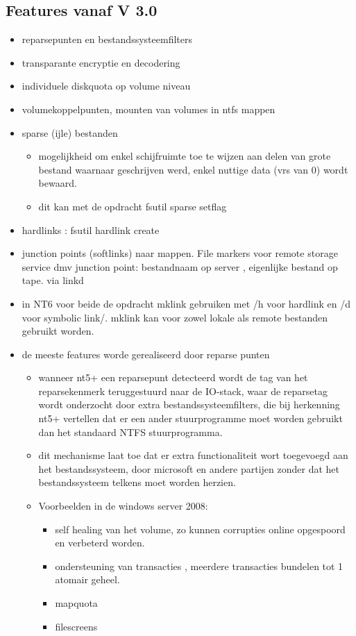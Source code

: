 \subsection{Features vanaf V 3.0}
\begin{itemize}
\item reparsepunten en bestandssysteemfilters
\item transparante encryptie en decodering
\item individuele diskquota op volume niveau
\item volumekoppelpunten, mounten van volumes in ntfs mappen
\item sparse (ijle) bestanden
\begin{itemize}
\item mogelijkheid om enkel schijfruimte toe te wijzen aan delen van grote bestand waarnaar geschrijven werd, enkel nuttige data (vrs van 0) wordt bewaard.
\item dit kan met de opdracht fsutil sparse setflag
\end{itemize}
\item hardlinks : fsutil hardlink create 
\item junction points (softlinks) naar mappen. File markers voor remote storage service dmv junction point: bestandnaam op server , eigenlijke bestand op tape. via linkd
\item in NT6 voor beide de opdracht mklink gebruiken met /h voor hardlink en /d voor symbolic link/. mklink kan voor zowel lokale als remote bestanden gebruikt worden.

\item de meeste features worde gerealiseerd door reparse punten
\begin{itemize}
\item wanneer nt5+ een reparsepunt detecteerd wordt de tag van het reparsekenmerk teruggestuurd naar de IO-stack, waar de reparsetag wordt onderzocht door extra bestandssysteemfilters, die bij herkenning nt5+ vertellen dat er een ander stuurprogramme moet worden gebruikt dan het standaard NTFS stuurprogramma.
\item dit mechanisme laat toe dat er extra functionaliteit wort toegevoegd aan het bestandssysteem, door microsoft en andere partijen zonder dat het bestandssysteem telkens moet worden herzien.
\item Voorbeelden in de windows server 2008:
\begin{itemize}
\item self healing van het volume, zo kunnen corrupties online opgespoord en verbeterd worden.
\item ondersteuning van transacties , meerdere transacties bundelen tot 1 atomair geheel.
\item mapquota 
\item filescreens
\end{itemize}
\end{itemize}

\end{itemize}